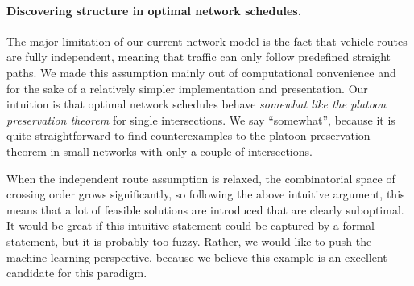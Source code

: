 \documentclass{report}
\theoremstyle{definition}
\theoremstyle{plain}
\begin{document}
\paragraph{Discovering structure in optimal network schedules.}

The major limitation of our current network model is the fact that vehicle
routes are fully independent, meaning that traffic can only follow predefined
straight paths.
%
We made this assumption mainly out of computational convenience and for the sake
of a relatively simpler implementation and presentation.
%
Our intuition is that optimal network schedules behave \emph{somewhat like the
  platoon preservation theorem} for single intersections.
%
We say ``somewhat'', because it is quite straightforward to find counterexamples
to the platoon preservation theorem in small networks with only a couple of
intersections.

When the independent route assumption is relaxed, the combinatorial space of
crossing order grows significantly, so following the above intuitive argument,
this means that a lot of feasible solutions are introduced that are clearly
suboptimal.
%
It would be great if this intuitive statement could be captured by a formal
statement, but it is probably too fuzzy.
%
Rather, we would like to push the machine learning perspective, because we
believe this example is an excellent candidate for this paradigm.





\end{document}
